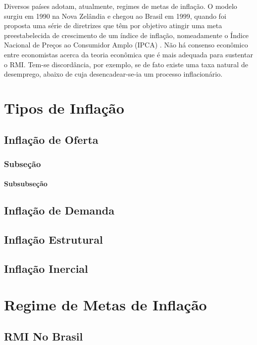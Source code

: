 \documentclass[12pt,oneside,a4paper,chapter=TITLE,english,brazil,sumario=abnt-6027-2012]{abntex2}
\begin{document}
Diversos países adotam, atualmente, regimes de metas de inflação. O modelo surgiu em 1990 na Nova Zelândia e chegou ao Brasil em 1999, quando foi proposta uma série de diretrizes que têm por objetivo atingir uma meta preestabelecida de crescimento de um índice de inflação, nomeadamente o Índice Nacional de Preços ao Consumidor Amplo (IPCA) \cite{sicsu2002teoriarmi}. Não há consenso econômico entre economistas acerca da teoria econômica que é mais adequada para sustentar o RMI. Tem-se discordância, por exemplo, se de fato existe uma taxa natural de desemprego, abaixo de cuja desencadear-se-ia um processo inflacionário.

\chapter{Tipos de Inflação}

\section{Inflação de Oferta}

\subsection{Subseção}

\subsubsection{Subsubseção}

\section{Inflação de Demanda}

\section{Inflação Estrutural}

\section{Inflação Inercial}

\chapter{Regime de Metas de Inflação}

\section{RMI No Brasil}
\end{document}
